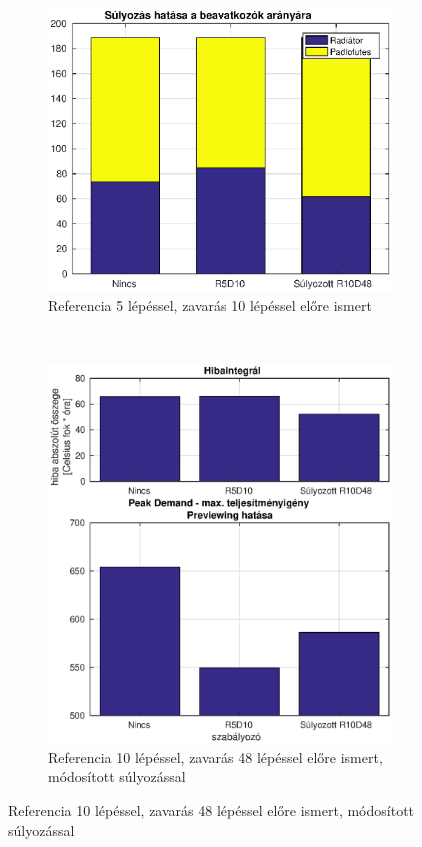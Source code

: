 \begin{figure}[H]
	\begin{subfigure}[t]{0.49\textwidth}
		\centering
		\includegraphics[trim=0 -40 0 0, clip,width=\textwidth]{figures/onlab/compare/A_diff_compareEnergy}
		\caption{Referencia 5 lépéssel, zavarás 10 lépéssel előre ismert}
		\label{fig:mpc-c-p5d10}
	\end{subfigure}
	~
	\begin{subfigure}[t]{0.49\textwidth}
		\centering
		\includegraphics[trim=0 0 0 0, clip,width=\textwidth]{figures/onlab/compare/A_diff_compareComfort}
		\caption{Referencia 10 lépéssel, zavarás 48 lépéssel előre ismert, módosított súlyozással}
		\label{fig:mpc-cdiff-p10d48}
	\end{subfigure}
\end{figure}

